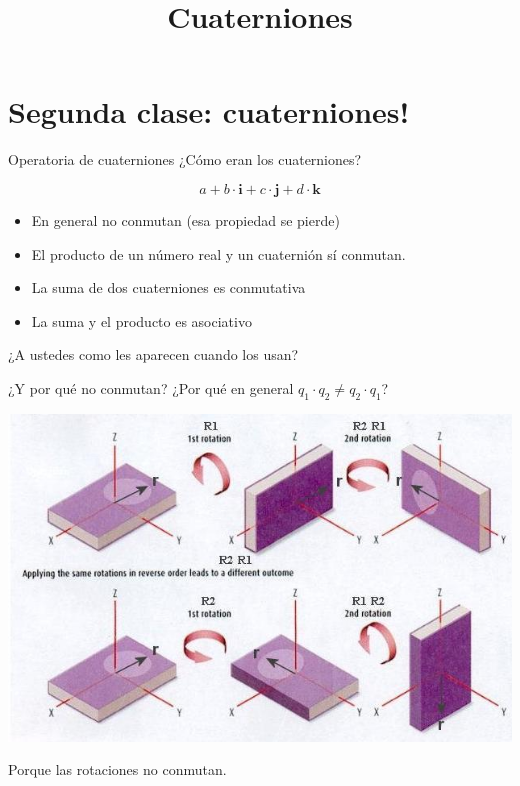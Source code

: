 \documentclass[10pt]{beamer}
\title{Cuaterniones}
\def\ii{\textbf{i}}
\def\jj{\textbf{j}}
\def\kk{\textbf{k}}
\begin{document}
\maketitle

\section{Segunda clase: cuaterniones!}


\begin{frame}{Operatoria de cuaterniones}
¿Cómo eran los cuaterniones? \pause

$$a + b \cdot \ii + c \cdot \jj + d \cdot \kk$$

\pause


\begin{itemize}
        \item En general no conmutan (esa propiedad se pierde)
		\item El producto de un número real y un cuaternión sí conmutan.
		\item La suma de dos cuaterniones es conmutativa
		\item La suma y el producto es asociativo		
\end{itemize} \pause

¿A ustedes como les aparecen cuando los usan?
	
\end{frame}

\begin{frame}{¿Y por qué no conmutan?}
    ¿Por qué en general $q_1 \cdot q_2 \neq q_2 \cdot q_1$? \pause
    
    \includegraphics[scale=0.6]{dontcommute.jpg}
    
    Porque las rotaciones no conmutan.
    
\end{frame}
\end{document}
